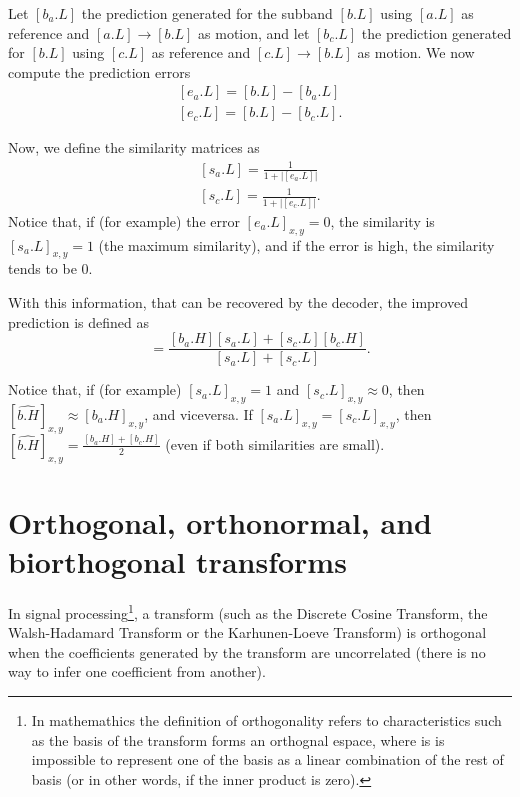 Let $[b_a.L]$ the prediction generated for the subband $[b.L]$ using
$[a.L]$ as reference and $[a.L]\rightarrow [b.L]$ as motion, and let
$[b_c.L]$ the prediction generated for $[b.L]$ using $[c.L]$ as
reference and $[c.L]\rightarrow [b.L]$ as motion. We now compute the
prediction errors
\begin{equation}
  \begin{array}{l}
    {[e_a.L]} = [b.L] - [b_a.L]\\
    {[e_c.L]} = [b.L] - [b_c.L].
  \end{array}
\end{equation}

Now, we define the similarity matrices as
\begin{equation}
  \begin{array}{l}
    {[s_a.L]} = \frac{1}{1+{|[e_a.L]|}}\\
    {[s_c.L]} = \frac{1}{1+{|[e_c.L]|}}.    
  \end{array}
  \label{eq:weighted_prediction}
\end{equation}
Notice that, if (for example) the error $[e_a.L]_{x,y}=0$, the
similarity is $[s_a.L]_{x,y}=1$ (the maximum similarity), and if the
error is high, the similarity tends to be $0$.

With this information, that can be recovered by the decoder, the
improved prediction is defined as
\begin{equation}
  [\hat{b.H}] = \frac{[b_a.H][s_a.L]+[s_c.L][b_c.H]}{[s_a.L]+[s_c.L]}.
\end{equation}

Notice that, if (for example) $[s_a.L]_{x,y}=1$ and
$[s_c.L]_{x,y}\approx 0$, then
$[\hat{b.H}]_{x,y}\approx [b_a.H]_{x,y}$, and viceversa. If
$[s_a.L]_{x,y}=[s_c.L]_{x,y}$, then
$[\hat{b.H}]_{x,y}=\frac{[b_a.H]+[b_c.H]}{2}$ (even if both similarities are small).



\section{Orthogonal, orthonormal, and biorthogonal transforms}
In signal processing\footnote{In mathemathics the definition of
  orthogonality refers to characteristics such as the basis of the
  transform forms an orthognal espace, where is is impossible to
  represent one of the basis as a linear combination of the rest of
  basis (or in other words, if the inner product is zero).}, a
transform (such as the Discrete Cosine Transform, the Walsh-Hadamard
Transform or the Karhunen-Loeve Transform) is orthogonal when the
coefficients generated by the transform are uncorrelated (there is no
way to infer one coefficient from another).

